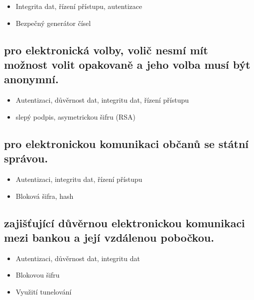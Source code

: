 \begin{itemize}
    \item Integrita dat, řízení přístupu, autentizace
    \item Bezpečný generátor čísel
\end{itemize}

\subsection{pro elektronická volby, volič nesmí mít možnost volit opakovaně a jeho volba musí být anonymní.}

\begin{itemize}
    \item Autentizaci, důvěrnost dat, integritu dat, řízení přístupu
    \item slepý podpis, asymetrickou šifru (RSA)
\end{itemize}


\subsection{pro elektronickou komunikaci občanů se státní správou.}

\begin{itemize}
    \item Autentizaci, integritu dat, řízení přístupu
    \item Bloková šifra, hash
\end{itemize}

\subsection{zajišťující důvěrnou elektronickou komunikaci mezi bankou a její vzdálenou pobočkou.}

\begin{itemize}
    \item Autentizaci, důvěrnost dat, integritu dat
    \item Blokovou šifru
    \item Využití tunelování
\end{itemize}
